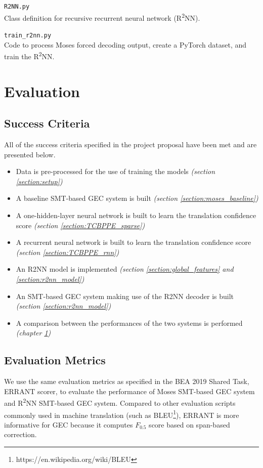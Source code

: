 \documentclass[12pt,a4paper,twoside,openright]{report}
\begin{document}
\texttt{R2NN.py}\\
Class definition for recursive recurrent neural network (R\textsuperscript{2}NN).

\texttt{train\_r2nn.py}\\
Code to process Moses forced decoding output, create a PyTorch dataset, and train the R\textsuperscript{2}NN.


\chapter{Evaluation}\label{chapter:evaluation}

\section{Success Criteria}\label{section:success_criteria}
All of the success criteria specified in the project proposal have been met and are presented below.
\begin{itemize}
    \item[\checkmark] Data is pre-processed for the use of training the models \textit{(section \ref{section:setup})}
    \item[\checkmark] A baseline SMT-based GEC system is built \textit{(section \ref{section:moses_baseline})}
    \item[\checkmark] A one-hidden-layer neural network is built to learn the translation confidence score \textit{(section \ref{section:TCBPPE_sparse})}
    \item[\checkmark] A recurrent neural network is built to learn the translation confidence score \textit{(section \ref{section:TCBPPE_rnn})}
    \item[\checkmark] An R2NN model is implemented \textit{(section \ref{section:global_features} and \ref{section:r2nn_model})}
    \item[\checkmark] An SMT-based GEC system making use of the R2NN decoder is built \textit{(section \ref{section:r2nn_model})}
    \item[\checkmark] A comparison between the performances of the two systems is performed \textit{(chapter \ref{chapter:evaluation})}
\end{itemize}

\section{Evaluation Metrics}
We use the same evaluation metrics as specified in the BEA 2019 Shared Task\cite{bryant-etal-2019-bea}, ERRANT scorer\cite{bryant-etal-2017-automatic}\cite{felice-etal-2016-automatic}, to evaluate the performance of Moses SMT-based GEC system and R\textsuperscript{2}NN SMT-based GEC system. Compared to other evaluation scripts commonly used in machine translation (such as BLEU\footnote{https://en.wikipedia.org/wiki/BLEU}), ERRANT is more informative for GEC because it computes $F_{0.5}$ score based on span-based correction.
\end{document}
